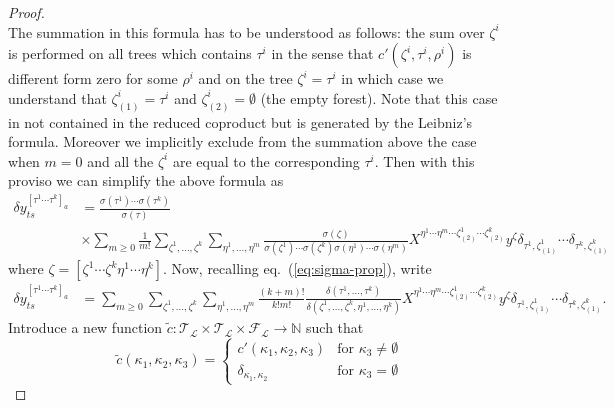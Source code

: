\documentclass[a4paper,11pt,reqno]{article}
\newcommand{\1}{{\bf 1}}
\newcommand{\der}{\delta}
\newcommand{\FF}{\mathcal{F}}
\newcommand{\LL}{\mathcal{L}}
\newcommand{\TT}{\mathcal{T}}
\begin{document}
\begin{proof}
\begin{equation}
 \end{equation}
The summation in this formula has to be understood as follows:
the sum over $\zeta^i$ is performed on all trees which contains $\tau^i$ in the sense that $c'(\zeta^i,\tau^i,\rho^i)$ is different form zero for some $\rho^i$ and on the tree $\zeta^i=\tau^i$ in which case we understand that $\zeta^i_{(1)}=\tau^i$ and $\zeta^i_{(2)} = \emptyset$ (the empty forest). Note that this case in not contained in the reduced coproduct but is generated by the Leibniz's formula. Moreover we implicitly exclude from the summation above the case when $m=0$ and all the $\zeta^i$ are equal to the corresponding $\tau^i$. Then with this proviso we can simplify the above formula as
\begin{equation}
  \label{eq:ytau-step-2-3}
  \begin{split}
 \der y^{[\tau^1 \cdots \tau^k]_a}_{ts} & = \frac{\sigma(\tau^1)\cdots \sigma(\tau^k)}{\sigma(\tau)} 
\\ & \times \sum_{m\ge 0} \frac{1}{m!}\sum_{\zeta^1,\dots,\zeta^k} \sum_{\eta^1,\dots,\eta^m}  
\frac{\sigma(\zeta)}{\sigma(\zeta^1)\cdots\sigma(\zeta^k) \sigma(\eta^1)\cdots\sigma(\eta^m)}
 X^{\eta^1\cdots \eta^m\cdots \zeta^1_{(2)}\cdots \zeta^k_{(2)}} y^{\zeta} \delta_{\tau^1,\zeta^1_{(1)}} \cdots \delta_{\tau^k,\zeta^k_{(1)}}
   \end{split}
 \end{equation}
where $\zeta = [\zeta^1\cdots\zeta^k \eta^1\cdots \eta^k]$. Now,
recalling eq.~(\ref{eq:sigma-prop}), write
\begin{equation}
  \label{eq:ytau-step-2-4}
  \begin{split}
 \der y^{[\tau^1 \cdots \tau^k]_a}_{ts} & =  \sum_{m\ge 0} \sum_{\zeta^1,\dots,\zeta^k} \sum_{\eta^1,\dots,\eta^m}
\frac{(k+m)!}{k!m!}
\frac{\delta(\tau^1,\dots,\tau^k)}{\delta(\zeta^1,\dots,\zeta^k,\eta^1,\dots,\eta^k)}
 X^{\eta^1\cdots \eta^m\cdots \zeta^1_{(2)}\cdots
  \zeta^k_{(2)}} y^{\zeta} \delta_{\tau^1,\zeta^1_{(1)}} \cdots
\delta_{\tau^k,\zeta^k_{(1)}} .
   \end{split}
 \end{equation}
Introduce a new function $\tilde c: \TT_\LL \times \TT_\LL \times \FF_\LL \to \mathbb{N}$ such that
$$
\tilde c(\kappa_1,\kappa_2,\kappa_3) = \begin{cases}
c'(\kappa_1,\kappa_2,\kappa_3) & \text{for $\kappa_3 \neq \emptyset$}\\
\delta_{\kappa_1,\kappa_2} & \text{for $\kappa_3 = \emptyset$}
\end{cases}
$$

\end{proof}
\end{document}
